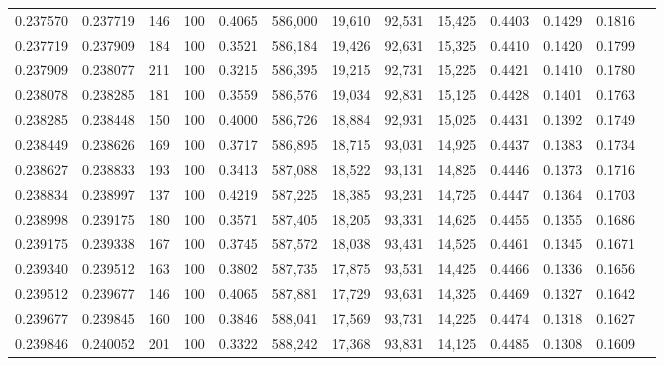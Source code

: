 \begin{tabular}{rrrrrrrrrrrrr}
0.237570 & 0.237719 &   146 & 100 &                                     0.4065 & 586,000 &  19,610 &  92,531 &  15,425 & 0.4403 & 0.1429 & 0.1816 \\
0.237719 & 0.237909 &   184 & 100 &                                     0.3521 & 586,184 &  19,426 &  92,631 &  15,325 & 0.4410 & 0.1420 & 0.1799 \\
0.237909 & 0.238077 &   211 & 100 &                                     0.3215 & 586,395 &  19,215 &  92,731 &  15,225 & 0.4421 & 0.1410 & 0.1780 \\
0.238078 & 0.238285 &   181 & 100 &                                     0.3559 & 586,576 &  19,034 &  92,831 &  15,125 & 0.4428 & 0.1401 & 0.1763 \\
0.238285 & 0.238448 &   150 & 100 &                                     0.4000 & 586,726 &  18,884 &  92,931 &  15,025 & 0.4431 & 0.1392 & 0.1749 \\
0.238449 & 0.238626 &   169 & 100 &                                     0.3717 & 586,895 &  18,715 &  93,031 &  14,925 & 0.4437 & 0.1383 & 0.1734 \\
0.238627 & 0.238833 &   193 & 100 &                                     0.3413 & 587,088 &  18,522 &  93,131 &  14,825 & 0.4446 & 0.1373 & 0.1716 \\
0.238834 & 0.238997 &   137 & 100 &                                     0.4219 & 587,225 &  18,385 &  93,231 &  14,725 & 0.4447 & 0.1364 & 0.1703 \\
0.238998 & 0.239175 &   180 & 100 &                                     0.3571 & 587,405 &  18,205 &  93,331 &  14,625 & 0.4455 & 0.1355 & 0.1686 \\
0.239175 & 0.239338 &   167 & 100 &                                     0.3745 & 587,572 &  18,038 &  93,431 &  14,525 & 0.4461 & 0.1345 & 0.1671 \\
0.239340 & 0.239512 &   163 & 100 &                                     0.3802 & 587,735 &  17,875 &  93,531 &  14,425 & 0.4466 & 0.1336 & 0.1656 \\
0.239512 & 0.239677 &   146 & 100 &                                     0.4065 & 587,881 &  17,729 &  93,631 &  14,325 & 0.4469 & 0.1327 & 0.1642 \\
0.239677 & 0.239845 &   160 & 100 &                                     0.3846 & 588,041 &  17,569 &  93,731 &  14,225 & 0.4474 & 0.1318 & 0.1627 \\
0.239846 & 0.240052 &   201 & 100 &                                     0.3322 & 588,242 &  17,368 &  93,831 &  14,125 & 0.4485 & 0.1308 & 0.1609 \\

\end{tabular}
